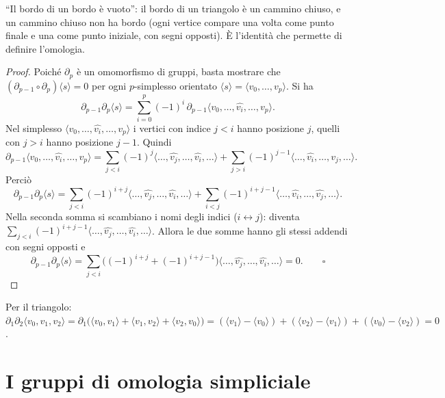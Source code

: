 \begin{intuizione}
``Il bordo di un bordo \`e vuoto'': il bordo di un triangolo \`e un cammino chiuso, e un cammino chiuso non ha bordo (ogni vertice compare una volta come punto finale e una come punto iniziale, con segni opposti). \`E l'identit\`a che permette di definire l'omologia.
\end{intuizione}

\begin{proof}
Poich\'e $\partial_p$ \`e un omomorfismo di gruppi, basta mostrare che $(\partial_{p-1} \circ \partial_p) \langle s \rangle = 0$ per ogni $p$-simplesso orientato $\langle s \rangle = \langle v_0, \dots, v_p \rangle$. Si ha
\[
\partial_{p-1} \partial_p \langle s \rangle = \sum_{i=0}^p (-1)^i\, \partial_{p-1} \langle v_0, \dots, \widehat{v_i}, \dots, v_p \rangle .
\]
Nel simplesso $\langle v_0, \dots, \widehat{v_i}, \dots, v_p \rangle$ i vertici con indice $j < i$ hanno posizione $j$, quelli con $j > i$ hanno posizione $j - 1$. Quindi
\[
\partial_{p-1} \langle v_0, \dots, \widehat{v_i}, \dots, v_p \rangle = \sum_{j < i} (-1)^j \langle \dots, \widehat{v_j}, \dots, \widehat{v_i}, \dots \rangle + \sum_{j > i} (-1)^{j-1} \langle \dots, \widehat{v_i}, \dots, \widehat{v_j}, \dots \rangle .
\]
Perci\`o
\[
\partial_{p-1} \partial_p \langle s \rangle = \sum_{j < i} (-1)^{i+j} \langle \dots, \widehat{v_j}, \dots, \widehat{v_i}, \dots \rangle + \sum_{i < j} (-1)^{i+j-1} \langle \dots, \widehat{v_i}, \dots, \widehat{v_j}, \dots \rangle .
\]
Nella seconda somma si scambiano i nomi degli indici ($i \leftrightarrow j$): diventa $\sum_{j < i} (-1)^{i+j-1} \langle \dots, \widehat{v_j}, \dots, \widehat{v_i}, \dots \rangle$. Allora le due somme hanno gli stessi addendi con segni opposti e
\[
\partial_{p-1} \partial_p \langle s \rangle = \sum_{j < i} \big( (-1)^{i+j} + (-1)^{i+j-1} \big) \langle \dots, \widehat{v_j}, \dots, \widehat{v_i}, \dots \rangle = 0 . \qquad \square
\]
\end{proof}

\begin{ejemplo}
Per il triangolo: $\partial_1 \partial_2 \langle v_0, v_1, v_2 \rangle = \partial_1 \big( \langle v_0, v_1 \rangle + \langle v_1, v_2 \rangle + \langle v_2, v_0 \rangle \big) = (\langle v_1 \rangle - \langle v_0 \rangle) + (\langle v_2 \rangle - \langle v_1 \rangle) + (\langle v_0 \rangle - \langle v_2 \rangle) = 0$.
\end{ejemplo}


\section{I gruppi di omologia simpliciale}

